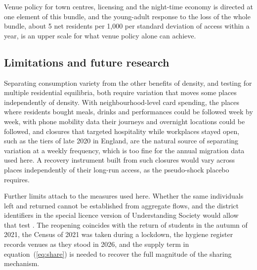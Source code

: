 \documentclass[11pt,a4paper]{article}
\begin{document}
Venue policy for town centres, licensing and the night-time economy is directed at one element of this bundle, and the young-adult response to the loss of the whole bundle, about 5 net residents per 1,000 per standard deviation of access within a year, is an upper scale for what venue policy alone can achieve.

\subsection{Limitations and future research}\label{sec:limits}

Separating consumption variety from the other benefits of density, and testing for multiple residential equilibria, both require variation that moves some places independently of density. With neighbourhood-level card spending, the places where residents bought meals, drinks and performances could be followed week by week, with phone mobility data their journeys and overnight locations could be followed, and closures that targeted hospitality while workplaces stayed open, such as the tiers of late 2020 in England, are the natural source of separating variation at a weekly frequency, which is too fine for the annual migration data used here. A recovery instrument built from such closures would vary across places independently of their long-run access, as the pseudo-shock placebo requires.

Further limits attach to the measures used here. Whether the same individuals left and returned cannot be established from aggregate flows, and the district identifiers in the special licence version of Understanding Society would allow that test \citep{iser2025usoc}. The reopening coincides with the return of students in the autumn of 2021, the Census of 2021 was taken during a lockdown, the hygiene register records venues as they stood in 2026, and the supply term in equation~(\ref{eq:share}) is needed to recover the full magnitude of the sharing mechanism.
\end{document}
